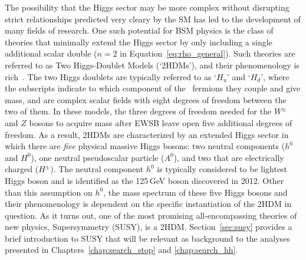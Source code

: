 The possibility that the Higgs sector may be more complex without disrupting strict relationships
predicted very cleary by the SM has led to the development of many fields of research.
One such potential for BSM physics is the class of theories that minimally extend the
Higgs sector by only including a single additional scalar double ($n = 2$ in Equation~\ref{eq:rho_general}).
Such theories are referred to as Two Higgs-Doublet Models (`2HDMs'), and their
phenomenology is rich~\cite{2HDMPheno}.
The two Higgs doublets are typically referred to as `$H_u$' and `$H_d$', where the subscripts
indicate to which component of the \SUtwo~fermions they couple and give mass, and are complex scalar
fields with eight degrees of freedom between the two of them.
In these models, the three degrees of freedom needed for the $W^{\pm}$ and $Z$ bosons
to acquire mass after EWSB leave open five additional degrees of freedom.
As a result, 2HDMs are characterized by an extended Higgs sector in which there are \textit{five}
physical massive Higgs bosons: two neutral components ($h^0$ and $H^0$), one neutral pseudoscalar particle ($A^0$),
and two that are electrically charged ($H^{\pm}$).
The neutral component $h^0$ is typically considered to be lightest Higgs boson and is identified as the
125\,GeV boson discovered in 2012.
Other than this assumption on $h^0$, the mass spectrum of these five Higgs bosons and their 
phenomenology is dependent on the specific instantiation of the 2HDM in question.
As it turns out, one of the most promising all-encompassing theories of new physics,
Supersymmetry (SUSY), is a 2HDM.
Section~\ref{sec:susy} provides a brief introduction to SUSY that will be relevant
as background to the analyses presented in Chapters~\ref{chap:search_stop} and \ref{chap:search_hh}.

%
%

